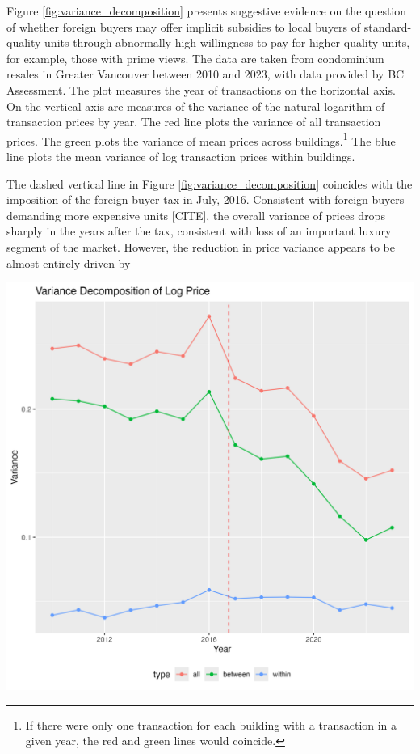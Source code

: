 \documentclass[12pt]{article}
\begin{document}
Figure \ref{fig:variance_decomposition} presents suggestive evidence on the question of
whether foreign buyers may offer implicit subsidies to local buyers of
standard-quality units through abnormally high willingness to pay for higher
quality units, for example, those with prime views. The data are taken from
condominium resales in Greater Vancouver between 2010 and 2023, with data
provided by BC Assessment. The plot measures the year of transactions on the
horizontal axis. On the vertical axis are measures of the variance of the
natural logarithm of transaction prices by year. The red line plots the
variance of all transaction prices. The green plots the variance of mean prices
across buildings.\footnote{If there were only one transaction for each building
with a transaction in a given year, the red and green lines would coincide.}
The blue line plots the mean variance of log transaction prices within
buildings. 

The dashed vertical line in Figure \ref{fig:variance_decomposition} coincides
with the imposition of the foreign buyer tax in July, 2016. Consistent with
foreign buyers demanding more expensive units [CITE], the overall variance of
prices drops sharply in the years after the tax, consistent with loss of an important luxury
segment of the market. However, the reduction in price variance appears to be
almost entirely driven by

\includegraphics[width=\textwidth]{text/variance_decomposition.png}
\end{document}
